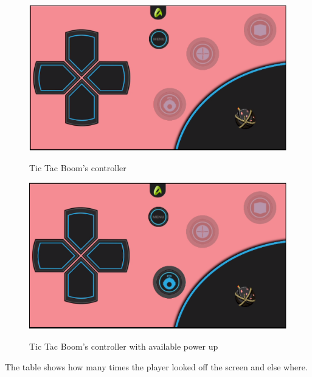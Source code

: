 \begin{figure}
\centering
\includegraphics[width=\textwidth]{figures/TTBcontrol} \label{fig:TTB1}
\caption{Tic Tac Boom's controller}
\end{figure}

\begin{figure}
\centering
\includegraphics[width=\textwidth]{figures/TTBpowerUp} \label{fig:TTB2}
\caption{Tic Tac Boom's controller with available power up}
\end{figure}

The table shows how many times the player looked off the screen and else where. 

